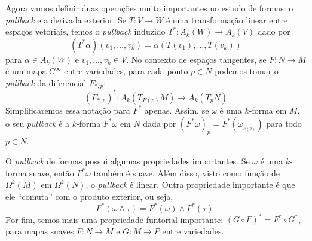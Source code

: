 Agora vamos definir duas operações muito importantes no estudo de formas: o \textit{pullback} e a derivada exterior. Se $T: V \longrightarrow W$ é uma transformação linear entre espaços vetoriais, temos o \textit{pullback} induzido $T^*: A_k(W) \longrightarrow A_k(V)$ dado por
\[
(T^*\alpha)(v_1,\dots,v_k) = \alpha(T(v_1),\dots,T(v_k))
\]
para $\alpha \in A_k(W)$ e $v_1,\dots,v_k \in V$. No contexto de espaços tangentes, se $F: N \longrightarrow M$ é um mapa $C^{\infty}$ entre variedades, para cada ponto $p \in N$ podemos tomar o \textit{pullback} da diferencial $F_{*,p}$:
\[
(F_{*,p})^*: A_k(T_{F(p)}M) \longrightarrow A_k(T_pN)
\]
Simplificaremos essa notação para $F^*$ apenas. Assim, se $\omega$ é uma $k$-forma em $M$, o seu \textit{pullback} é a $k$-forma $F^*\omega$ em $N$ dada por $(F^*\omega)_p = F^*(\omega_{_{F(p)}})$ para todo $p \in N$.

O \textit{pullback} de formas possui algumas propriedades importantes. Se $\omega$ é uma $k$-forma suave, então $F^*\omega$ também é suave. Além disso, visto como função de $\Omega^k(M)$ em $\Omega^k(N)$, o \textit{pullback} é linear. Outra propriedade importante é que ele ``comuta'' com o produto exterior, ou seja,
\[
F^*(\omega \wedge \tau) = F^*(\omega) \wedge F^*(\tau).
\]
Por fim, temos mais uma propriedade funtorial importante: $(G \circ F)^* = F^* \circ G^*$, para mapas suaves $F: N \longrightarrow M$ e $G: M \longrightarrow P$ entre variedades.

